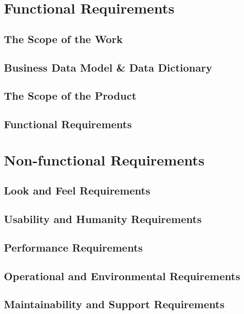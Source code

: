 \documentclass[12pt,fleqn]{article}
\begin{document}
\pagebreak

\section {Functional Requirements}

\subsection {The Scope of the Work}

\subsection {Business Data Model \& Data Dictionary}

\subsection {The Scope of the Product}

\subsection {Functional Requirements}

\section {Non-functional Requirements}

\subsection {Look and Feel Requirements}

\subsection {Usability and Humanity Requirements}

\subsection {Performance Requirements}

\subsection {Operational and Environmental Requirements}

\subsection {Maintainability and Support Requirements}
\end{document}
